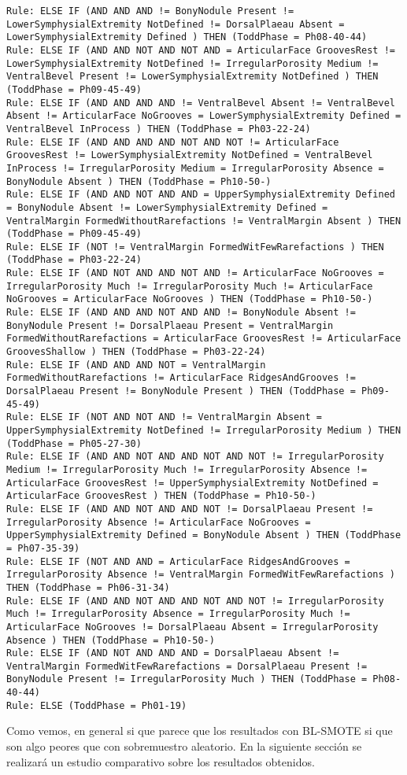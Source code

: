 \begin{lstlisting}
Rule: ELSE IF (AND AND AND != BonyNodule Present != LowerSymphysialExtremity NotDefined != DorsalPlaeau Absent = LowerSymphysialExtremity Defined ) THEN (ToddPhase = Ph08-40-44)
Rule: ELSE IF (AND AND NOT AND NOT AND = ArticularFace GroovesRest != LowerSymphysialExtremity NotDefined != IrregularPorosity Medium != VentralBevel Present != LowerSymphysialExtremity NotDefined ) THEN (ToddPhase = Ph09-45-49)
Rule: ELSE IF (AND AND AND AND != VentralBevel Absent != VentralBevel Absent != ArticularFace NoGrooves = LowerSymphysialExtremity Defined = VentralBevel InProcess ) THEN (ToddPhase = Ph03-22-24)
Rule: ELSE IF (AND AND AND AND NOT AND NOT != ArticularFace GroovesRest != LowerSymphysialExtremity NotDefined = VentralBevel InProcess != IrregularPorosity Medium = IrregularPorosity Absence = BonyNodule Absent ) THEN (ToddPhase = Ph10-50-)
Rule: ELSE IF (AND AND NOT AND AND = UpperSymphysialExtremity Defined = BonyNodule Absent != LowerSymphysialExtremity Defined = VentralMargin FormedWithoutRarefactions != VentralMargin Absent ) THEN (ToddPhase = Ph09-45-49)
Rule: ELSE IF (NOT != VentralMargin FormedWitFewRarefactions ) THEN (ToddPhase = Ph03-22-24)
Rule: ELSE IF (AND NOT AND AND NOT AND != ArticularFace NoGrooves = IrregularPorosity Much != IrregularPorosity Much != ArticularFace NoGrooves = ArticularFace NoGrooves ) THEN (ToddPhase = Ph10-50-)
Rule: ELSE IF (AND AND AND NOT AND AND != BonyNodule Absent != BonyNodule Present != DorsalPlaeau Present = VentralMargin FormedWithoutRarefactions = ArticularFace GroovesRest != ArticularFace GroovesShallow ) THEN (ToddPhase = Ph03-22-24)
Rule: ELSE IF (AND AND AND NOT = VentralMargin FormedWithoutRarefactions != ArticularFace RidgesAndGrooves != DorsalPlaeau Present != BonyNodule Present ) THEN (ToddPhase = Ph09-45-49)
Rule: ELSE IF (NOT AND NOT AND != VentralMargin Absent = UpperSymphysialExtremity NotDefined != IrregularPorosity Medium ) THEN (ToddPhase = Ph05-27-30)
Rule: ELSE IF (AND AND NOT AND AND NOT AND NOT != IrregularPorosity Medium != IrregularPorosity Much != IrregularPorosity Absence != ArticularFace GroovesRest != UpperSymphysialExtremity NotDefined = ArticularFace GroovesRest ) THEN (ToddPhase = Ph10-50-)
Rule: ELSE IF (AND AND NOT AND AND NOT != DorsalPlaeau Present != IrregularPorosity Absence != ArticularFace NoGrooves = UpperSymphysialExtremity Defined = BonyNodule Absent ) THEN (ToddPhase = Ph07-35-39)
Rule: ELSE IF (NOT AND AND = ArticularFace RidgesAndGrooves = IrregularPorosity Absence != VentralMargin FormedWitFewRarefactions ) THEN (ToddPhase = Ph06-31-34)
Rule: ELSE IF (AND AND NOT AND AND NOT AND NOT != IrregularPorosity Much != IrregularPorosity Absence = IrregularPorosity Much != ArticularFace NoGrooves != DorsalPlaeau Absent = IrregularPorosity Absence ) THEN (ToddPhase = Ph10-50-)
Rule: ELSE IF (AND NOT AND AND AND = DorsalPlaeau Absent != VentralMargin FormedWitFewRarefactions = DorsalPlaeau Present != BonyNodule Present != IrregularPorosity Much ) THEN (ToddPhase = Ph08-40-44)
Rule: ELSE (ToddPhase = Ph01-19)
\end{lstlisting}


Como vemos, en general si que parece que los resultados con BL-SMOTE si que son algo peores que con sobremuestro aleatorio. En la siguiente sección se realizará un estudio comparativo sobre los resultados obtenidos.


\newpage
